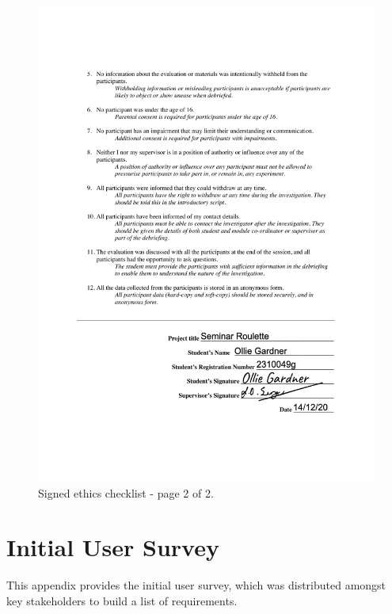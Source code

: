 \documentclass{l4proj}
\begin{document}
\begin{appendices}
\begin{figure}[htb]
    \centering
    \includegraphics[width=0.85\linewidth]{images/signed_ethics_checklist_2.pdf}    
    \caption{Signed ethics checklist - page 2 of 2.}
    \label{fig:signed_ethics_checklist_2} 
\end{figure}


\chapter{Initial User Survey}
\label{appendix:initial_user_survey}

This appendix provides the initial user survey, which was distributed amongst key stakeholders to build a list of requirements.


\end{appendices}
\end{document}

